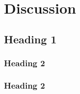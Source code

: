 \chapter[Discussion]{Discussion}
\label{Chap:Discussion}



\section{Heading 1}

\subsection{Heading 2}
\lipsum[4] %

\subsection{Heading 2}
\lipsum[4]

